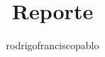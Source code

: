 \documentclass{mylib/reporte}
\title{Reporte}
\author{rodrigofranciscopablo }
\begin{document}
\coverPage
\end{document}
